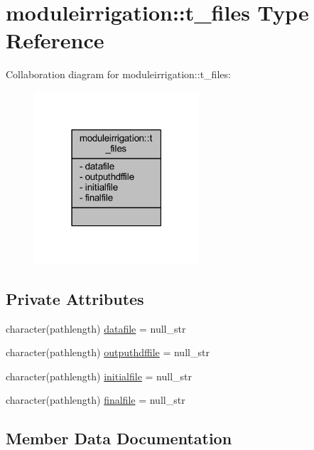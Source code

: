 \hypertarget{structmoduleirrigation_1_1t__files}{}\section{moduleirrigation\+:\+:t\+\_\+files Type Reference}
\label{structmoduleirrigation_1_1t__files}


Collaboration diagram for moduleirrigation\+:\+:t\+\_\+files\+:\nopagebreak
\begin{figure}[H]
\begin{center}
\leavevmode
\includegraphics[width=174pt]{structmoduleirrigation_1_1t__files__coll__graph}
\end{center}
\end{figure}
\subsection*{Private Attributes}
\begin{DoxyCompactItemize}
\item 
character(pathlength) \mbox{\hyperlink{structmoduleirrigation_1_1t__files_a522dc981c4df6bc40f0ae0a900aad8cf}{datafile}} = null\+\_\+str
\item 
character(pathlength) \mbox{\hyperlink{structmoduleirrigation_1_1t__files_aca2b741395234190a1d6da6f5facc7c9}{outputhdffile}} = null\+\_\+str
\item 
character(pathlength) \mbox{\hyperlink{structmoduleirrigation_1_1t__files_a10ec2ddeae4cd0e68a025f33c8d23eea}{initialfile}} = null\+\_\+str
\item 
character(pathlength) \mbox{\hyperlink{structmoduleirrigation_1_1t__files_a07d8e60c85a0df777f34772b48f40eff}{finalfile}} = null\+\_\+str
\end{DoxyCompactItemize}


\subsection{Member Data Documentation}
\mbox{\label{structmoduleirrigation_1_1t__files_a522dc981c4df6bc40f0ae0a900aad8cf}} 
